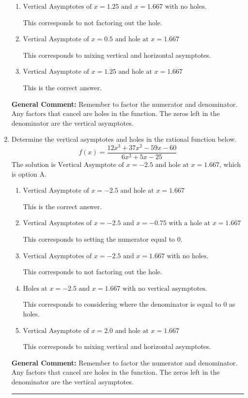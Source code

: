 \documentclass{extbook}[14pt]
\newcommand{\litem}[1]{\item #1

\rule{\textwidth}{0.4pt}}
\begin{document}
\begin{enumerate}
{\begin{enumerate}[label=\Alph*.]
This corresponds to setting the numerator equal to 0.
\item \( \text{Vertical Asymptotes of } x = 1.25 \text{ and } x = 1.667 \text{ with no holes.} \)

This corresponds to not factoring out the hole.
\item \( \text{Vertical Asymptote of } x = 0.5 \text{ and hole at } x = 1.667 \)

This corresponds to mixing vertical and horizontal asymptotes.
\item \( \text{Vertical Asymptote of } x = 1.25 \text{ and hole at } x = 1.667 \)

This is the correct answer.
\end{enumerate}

\textbf{General Comment:} Remember to factor the numerator and denominator. Any factors that cancel are holes in the function. The zeros left in the denominator are the vertical asymptotes.
}
\litem{
Determine the vertical asymptotes and holes in the rational function below.
\[ f(x) = \frac{12x^{3} +37 x^{2} -59 x -60}{6x^{2} +5 x -25} \]The solution is \( \text{Vertical Asymptote of } x = -2.5 \text{ and hole at } x = 1.667 \), which is option A.\begin{enumerate}[label=\Alph*.]
\item \( \text{Vertical Asymptote of } x = -2.5 \text{ and hole at } x = 1.667 \)

This is the correct answer.
\item \( \text{Vertical Asymptotes of } x = -2.5 \text{ and } x = -0.75 \text{ with a hole at } x = 1.667 \)

This corresponds to setting the numerator equal to 0.
\item \( \text{Vertical Asymptotes of } x = -2.5 \text{ and } x = 1.667 \text{ with no holes.} \)

This corresponds to not factoring out the hole.
\item \( \text{Holes at } x = -2.5 \text{ and } x = 1.667 \text{ with no vertical asymptotes.} \)

This corresponds to considering where the denominator is equal to 0 as holes.
\item \( \text{Vertical Asymptote of } x = 2.0 \text{ and hole at } x = 1.667 \)

This corresponds to mixing vertical and horizontal asymptotes.
\end{enumerate}

\textbf{General Comment:} Remember to factor the numerator and denominator. Any factors that cancel are holes in the function. The zeros left in the denominator are the vertical asymptotes.
}
\end{enumerate}
\end{document}

